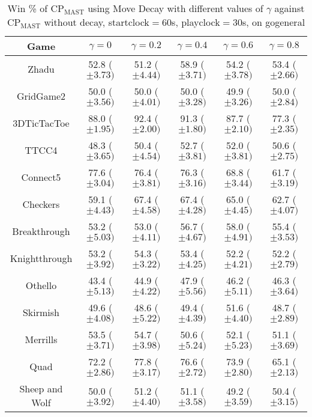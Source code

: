 \documentclass[journal]{IEEEtran}
\begin{document}
\begin{table*}[t]
\caption{Win \% of CP$_{\textrm{MAST}}$ using Move Decay with different values of $\gamma$ against CP$_{\textrm{MAST}}$ without decay, startclock$=$60s, playclock$=$30s, on gogeneral}
\label{table:expMast}
\centering
\begin{tabular}{|c|c|c|c|c|c|}
\hline
 \textbf{Game} & $ \gamma = 0$ & $ \gamma = 0.2$ & $ \gamma = 0.4$ & $ \gamma = 0.6$ & $ \gamma = 0.8$\\
\hline\hline
Zhadu & 52.8 ($\pm 3.73)$ & 51.2 ($\pm 4.44)$ & 58.9 ($\pm 3.71)$ & 54.2 ($\pm 3.78)$ & 53.4 ($\pm 2.66)$ \\ 
GridGame2 & 50.0 ($\pm 3.56)$ & 50.0 ($\pm 4.01)$ & 50.0 ($\pm 3.28)$ & 49.9 ($\pm 3.26)$ & 50.0 ($\pm 2.84)$  \\ 
3DTicTacToe & 88.0 ($\pm 1.95)$ & 92.4 ($\pm 2.00)$ & 91.3 ($\pm 1.80)$ & 87.7 ($\pm 2.10)$ & 77.3 ($\pm 2.35)$  \\ 
TTCC4 & 48.3 ($\pm 3.65)$ & 50.4 ($\pm 4.54)$ & 52.7 ($\pm 3.81)$ & 52.0 ($\pm 3.81)$ & 50.6 ($\pm 2.75)$  \\ 
Connect5 & 77.6 ($\pm 3.04)$ & 76.4 ($\pm 3.81)$ & 76.3 ($\pm 3.16)$ & 68.8 ($\pm 3.44)$ & 61.7 ($\pm 3.19)$   \\ 
Checkers & 59.1 ($\pm 4.43)$ & 67.4 ($\pm 4.58)$ & 67.4 ($\pm 4.28)$ & 65.0 ($\pm 4.45)$ & 62.7 ($\pm 4.07)$  \\ 
Breakthrough & 53.2 ($\pm 5.03)$ & 53.0 ($\pm 4.11)$ & 56.7 ($\pm 4.67)$ & 58.0 ($\pm 4.91)$ & 55.4 ($\pm 3.53)$  \\ 
Knightthrough & 53.2 ($\pm 3.92)$ & 54.3 ($\pm 3.22)$ & 53.4 ($\pm 4.25)$ & 52.2 ($\pm 4.21 )$ & 52.2 ($\pm 2.79)$  \\ 
Othello & 43.4 ($\pm 5.13)$ & 44.9 ($\pm 4.22)$ & 47.9 ($\pm 5.56)$ & 46.2 ($\pm 5.11)$ & 46.3 ($\pm 3.64)$  \\ 
Skirmish & 49.6 ($\pm 4.08 )$ & 48.6 ($\pm 5.22)$ & 49.4 ($\pm 4.39)$ & 51.6 ($\pm 4.40)$ & 48.7 ($\pm 2.89)$  \\
Merrills & 53.5 ($\pm 3.71)$ & 54.7 ($\pm 3.98)$ & 50.6 ($\pm 5.24)$ & 52.1 ($\pm 5.23)$ & 51.1 ($\pm 3.69)$ \\ 
Quad & 72.2 ($\pm 2.86)$ & 77.8 ($\pm 3.17)$ & 76.6 ($\pm 2.72)$ & 73.9 ($\pm 2.80)$ & 65.1 ($\pm 2.13)$  \\ 
Sheep and Wolf & 50.0 ($\pm 3.92)$ & 51.2 ($\pm 4.40)$ & 51.1 ($\pm 3.58)$ & 49.2 ($\pm 3.59)$ & 50.4 ($\pm 3.15)$  \\ 

\end{tabular}
\end{table*}
\end{document}

